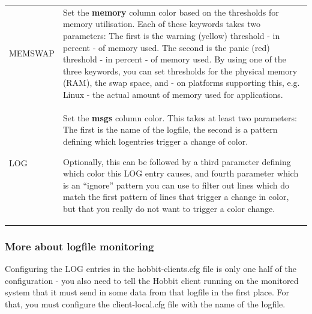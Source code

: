 \begin{tabular}{l|l}
MEMSWAP & Set the \textbf{memory}
 column color based on the thresholds for memory utilisation. Each of these keywords takes two parameters: The first is the warning (yellow) threshold - in percent - of memory used. The second is the panic (red) threshold - in percent - of memory used. 
 By using one of the three keywords, you can set thresholds for the physical memory (RAM), the swap space, and - on platforms supporting this, e.g. Linux - the actual amount of memory used for applications.  \\

LOG & Set the \textbf{msgs} column color. This takes at least two
 parameters: The first is the name of the logfile, the second is a
 pattern defining which logentries trigger a change of color. 

 Optionally, this can be followed by a third parameter defining which color this LOG entry causes, and fourth parameter which is an ``ignore'' pattern you can use to filter out lines which do match the first pattern of lines that trigger a change in color, but that you really do not want to trigger a color change. 


\end{tabular}

\subsubsection{More about logfile monitoring}


 Configuring the LOG entries in the hobbit-clients.cfg file is only one half of the configuration - you also need to tell the Hobbit client running on the monitored system that it must send in some data from that logfile in the first place. For that, you must configure the  client-local.cfg file with the name of the logfile.

